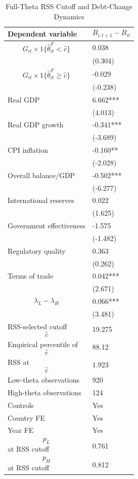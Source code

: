\begin{table}[H]\centering
\begin{threeparttable}
\caption{Full-Theta RSS Cutoff and Debt-Change Dynamics}
\label{tab:deltaB_rss_cutoff_fulltheta}
\scriptsize
\begin{tabularx}{\textwidth}{lY}
\toprule
Dependent variable & $$B_{i,t+1}-B_{it}$$ \\
\midrule
$$G_{it}\times 1\{\widehat{\theta}^{F}_{it}<\widehat{c}\}$$ & 0.038 \\
 & (0.304) \\
$$G_{it}\times 1\{\widehat{\theta}^{F}_{it}\geq\widehat{c}\}$$ & -0.029 \\
 & (-0.238) \\
Real GDP & 6.662*** \\
 & (4.013) \\
Real GDP growth & -0.341*** \\
 & (-3.689) \\
CPI inflation & -0.160** \\
 & (-2.028) \\
Overall balance/GDP & -0.502*** \\
 & (-6.277) \\
International reserves & 0.022 \\
 & (1.625) \\
Government effectiveness & -1.575 \\
 & (-1.482) \\
Regulatory quality & 0.363 \\
 & (0.262) \\
Terms of trade & 0.042*** \\
 & (2.671) \\
$$\lambda_L-\lambda_H$$ & 0.066*** \\
 & (3.481) \\
\midrule
RSS-selected cutoff $$\widehat{c}$$ & 19.275 \\
Empirical percentile of $$\widehat{c}$$ & 88.12 \\
RSS at $$\widehat{c}$$ & 1.923 \\
Low-theta observations & 920 \\
High-theta observations & 124 \\
Controls & Yes \\
Country FE & Yes \\
Year FE & Yes \\
$$p_L$$ at RSS cutoff & 0.761 \\
$$p_H$$ at RSS cutoff & 0.812 \\

\end{tabularx}
\end{threeparttable}
\end{table}
